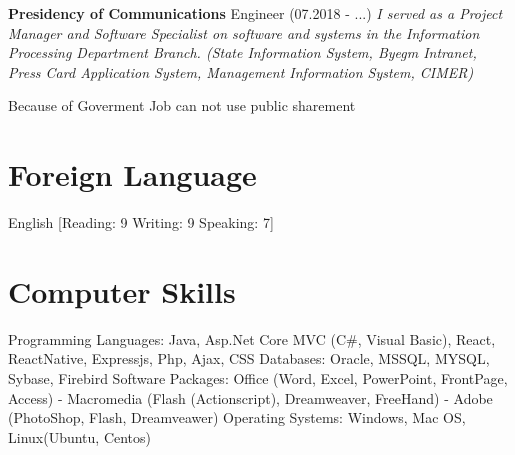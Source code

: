 \documentclass{article}
\begin{document}
\noindent \textbf{Presidency of Communications}
\newline Engineer (07.2018 - ...)
\newline \textit{I served as a Project Manager and Software Specialist on software and systems in the Information Processing Department Branch. (State Information System, Byegm Intranet, Press Card Application System, Management Information System, CIMER)}

Because of Goverment Job can not use public sharement

\section*{Foreign Language}

\noindent English [Reading: 9 Writing: 9 Speaking: 7]

\section*{Computer Skills}

\noindent Programming Languages: Java, Asp.Net Core MVC (C\#, Visual Basic), React, ReactNative, Expressjs, Php, Ajax, CSS
\newline Databases: Oracle, MSSQL, MYSQL, Sybase, Firebird
\newline Software Packages: Office (Word, Excel, PowerPoint, FrontPage, Access) - Macromedia (Flash (Actionscript), Dreamweaver, FreeHand) - Adobe (PhotoShop, Flash, Dreamveawer)
\newline Operating Systems: Windows, Mac OS, Linux(Ubuntu, Centos)
\end{document}
